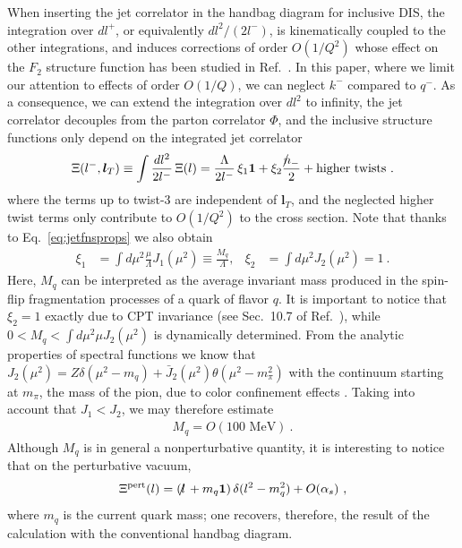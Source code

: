 \documentclass[preprintnumbers,floatfix,nofootinbib]{revtex4}
\newcommand{\lslash}{l \hspace{-0.19cm} / \,}
\newcommand{\nslash}{n \hspace{-0.24cm} / \,}
\newcommand{\mj}{M_q}
\newcommand{\mq}{m_q}
\newcommand{\id}{{\bm 1}
}
\begin{document}
When inserting the jet correlator in the handbag diagram for inclusive DIS, the integration over $dl^+$, or equivalently $dl^2/(2l^-)$, is kinematically coupled to the other integrations, and induces corrections of order $O(1/Q^2)$ whose effect on the $F_2$ structure function has been studied in Ref.~\cite{Accardi:2008ne}. In this paper, where we limit our
attention to effects of order $O(1/Q)$, we can neglect $k^-$ compared to $q^-$. As a consequence, we can extend the integration over $dl^2$ to infinity, the jet correlator decouples from the parton correlator $\Phi$, and the inclusive structure functions only depend on the integrated jet correlator 
\begin{equation} 
  \Xi(l^-,{\bm l_T}) \equiv \int \frac{dl^2}{2l^-} \, \Xi(l) 
    =  \frac{\Lambda}{2 l^-}\,\xi_1 \id
    +  \xi_2 \frac{\nslash_-}{2} 
    + \text{higher\ twists} \ .
\end{equation} 
where the terms up to twist-3 are independent of ${\bm l_T}$, and the neglected higher twist terms only contribute to $O(1/Q^2)$ to the cross section. Note that thanks to Eq.~\eqref{eq:jetfnsprops} we also obtain
\begin{align}
\xi_1 &= \int d\mu^2 \frac{\mu}{\Lambda} J_1(\mu^2) 
       \equiv \frac{\mj}{\Lambda},
&
\xi_2 &= \int d\mu^2 J_2(\mu^2) = 1 \ .
\end{align} 
Here, $\mj$ can be interpreted as the average invariant mass produced in the spin-flip fragmentation processes of a quark of flavor $q$.
It is important to notice that $\xi_2=1$ exactly due to CPT invariance
(see Sec.~10.7 of Ref.~\cite{Weinberg:1995mt}), while $0 < \mj < \int d\mu^2 \mu J_2(\mu^2)$ is dynamically determined. From the analytic properties of spectral functions we know that $J_2(\mu^2) = Z \delta(\mu^2-m_q) + \bar J_2
(\mu^2) \theta (\mu^2-m_\pi^2)$ with the continuum starting at $m_\pi$, the
mass of the pion, due to color confinement effects \cite{Accardi:2008ne}. Taking into account that $J_1 < J_2$, we may therefore estimate 
\begin{align}
  \label{eq:mjet}
  \mj = O(100 \text{ MeV}) \ .
\end{align}
Although $\mj$ is in general a nonperturbative quantity, it is interesting to
notice that on the perturbative vacuum, 
\begin{align*}
  \Xi^\text{pert}(l) = (\lslash + m_q \id) \, \delta(l^2-m_q^2) + O(\alpha_s) \ ,
\end{align*}
where $\mq$ is the current quark mass; one recovers, therefore, the result of the calculation with the conventional handbag diagram.
\end{document}
